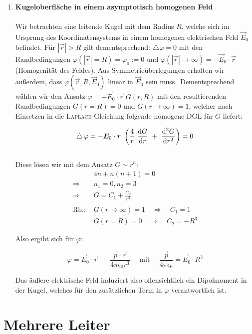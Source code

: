 \begin{enumerate}
\item \textbf{ Kugeloberfläche in einem asymptotisch homogenen Feld}\\
\ \\
Wir betrachten eine leitende Kugel mit dem Radius $R$, welche sich im Ursprung des Koordinatensystems in einem homogenen elektrischen Feld $\vec{E}_0$ befindet. Für $|\vec{r}|>R$ gilt dementsprechend: $\bigtriangleup\varphi = 0$ mit den Randbedingungen $\varphi(|\vec{r}| = R) = \varphi_0 := 0$ und $\varphi(|\vec{r}|\rightarrow\infty) = -\vec{E}_0\cdot\vec{r}$ (Homogenität des Feldes). Aus Symmetrieüberlegungen erhalten wir außerdem, dass $\varphi(\vec{r},R,\vec{E}_0)$ linear in $\vec{E}_0$ sein muss.\
Dementsprechend wählen wir den Ansatz $\varphi = -\vec{E}_0 \cdot\vec{r} \ G(r,R)$ mit den resultierenden Randbedingungen $G(r=R)=0$ und $G(r\rightarrow\infty
) =1$, welcher nach Einsetzen in die \textsc{Laplace}-Gleichung folgende homogene DGL für $G$ liefert:

\begin{equation*}
\mathop{{}\bigtriangleup}\nolimits\varphi = -\bm{E}_0\cdot\bm{r} \ \left(\frac{4}{r} \ \frac{\mathrm{d}{G}}{\mathrm{d}{r}} \ + \ \frac{\mathrm{d}^2{G}}{\mathrm{d}{r}^2}\right) = 0
\end{equation*}
\ \\
Diese lösen wir mit dem Ansatz $G \sim r^n$:
\begin{align*}
& 4n + n(n+1) = 0\\
\Rightarrow & n_1 = 0, n_2=3\\
\Rightarrow & G = C_1 + \frac{C_2}{r^3}\\
\ \\
\text{Rb.: } & G(r\rightarrow\infty) = 1 \quad \Rightarrow \quad C_1 = 1\\
& G(r=R) = 0 \quad \Rightarrow \quad C_2 = -R^3 
\end{align*}

Also ergibt sich für $\varphi$:

\begin{equation*}
\varphi = \vec{E}_0\cdot\vec{r} \ + \ \frac{\vec{p} \cdot\vec{r}}{4\pi\epsilon_0 r^3} \quad
\text{ mit } \quad \frac{\vec{p}}{4\pi\epsilon_0} = \vec{E}_0 \cdot R^3
\end{equation*}

Das äußere elektrische Feld induziert also offensichtlich ein Dipolmoment in der Kugel, welches für den zusätzlichen Term in $\varphi$ verantwortlich ist.
\end{enumerate}
\newpage

\section{Mehrere Leiter}

